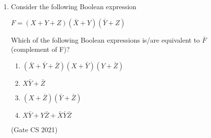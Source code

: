 \documentclass[12pt]{article}                         \usepackage{hyperref}                                 \usepackage{listings}
\date{\today}
\begin{document}
\maketitle{}
\begin{enumerate}
\item Consider the following Boolean expression 

            \begin{center}$F = (X+Y+Z)(\bar{X}+Y)(\bar{Y}+Z)$ \end{center}  
       
Which of the following Boolean expressions is/are equivalent to $\overline{F}$ (complement of F)?
\begin{enumerate}                                     
\item $(\bar{X}+\bar{Y}+\bar{Z})(X+\bar{Y})(Y+\bar{Z})$
\item $X\bar{Y}+\bar{Z}$
\item $(X+\bar{Z})(\bar{Y}+\bar{Z})$
\item $X\bar{Y}+Y\bar{Z}+\bar{X}\bar{Y}\bar{Z}$ 
\end{enumerate}
\hfill{(Gate CS 2021)}
\end{enumerate}
\end{document}

